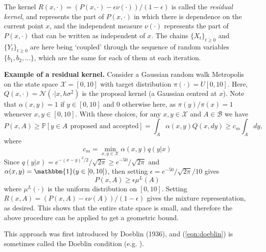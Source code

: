 \documentclass{article}
\newcommand{\ch}[1]{ \{#1_t\}_{t \geq 0} }
\newcommand{\X}{\mathcal{X}}
\newcommand{\B}{\mathcal{B}}
\begin{document}
The kernel $R(x,\cdot) = (P(x,\cdot) - \epsilon\nu(\cdot))/(1-\epsilon)$ is called the \emph{residual kernel}, and represents the part of $P(x,\cdot)$ in which there is dependence on the current point $x$, and the independent measure $\nu(\cdot)$ represents the part of $P(x,\cdot)$ that can be written as independent of $x$.  The chains $\ch{X}$ and $\ch{Y}$ are here being `coupled' through the sequence of random variables $\{b_1,b_2,...\}$, which are the same for each of them at each iteration.

\vspace{0.3cm}

{\color{darkblue}
\textbf{Example of a residual kernel.}  Consider a Gaussian random walk Metropolis on the state space $\X = [0,10]$ with target distribution $\pi(\cdot) = U[0,10]$. Here,  $Q(x,\cdot) = \mathcal{N}(\cdot|x,h\sigma^2)$ is the proposal kernel (a Gaussian centred at $x$).  Note that $\alpha(x,y) = 1$ if $y \in [0,10]$ and $0$ otherwise here, as $\pi(y)/\pi(x) = 1$ whenever $x,y \in [0,10]$.  With these choices, for any $x,y \in \X$ and $A \in \B$ we have
\[
P(x,A) \geq \mathbb{P}[y \in A ~~ \text{proposed and accepted}] = \int_A \alpha(x,y)Q(x,dy) \geq c_m\int_A  dy,
\]
where
\[
c_m = \min_{x,y \in \X}{\alpha(x,y)q(y|x)}
\]
Since $q(y|x) = e^{-(x-y)^2/2}/\sqrt{2\pi} \geq e^{-50}/\sqrt{2\pi}$ and $\alpha(x,y) = \mathbbm{1}(y \in [0,10])$, then setting $\epsilon = e^{-50}/\sqrt{2\pi}/10$ gives
\[
P(x,A) \geq \epsilon \mu^L(A)
\]
where $\mu^L(\cdot)$ is the uniform distribution on $[0,10]$.  Setting $R(x,A) = (P(x,A) - \epsilon \nu(A))/(1-\epsilon)$ gives the mixture representation, as desired.  This shows that the entire state space is small, and therefore the above procedure can be applied to get a geometric bound.
}
\vspace{0.3cm}

This approach was first introduced by Doeblin (1936), and (\ref{eqn:doeblin}) is sometimes called the Doeblin condition (e.g. \cite{norris1997markov}).  
\end{document}
